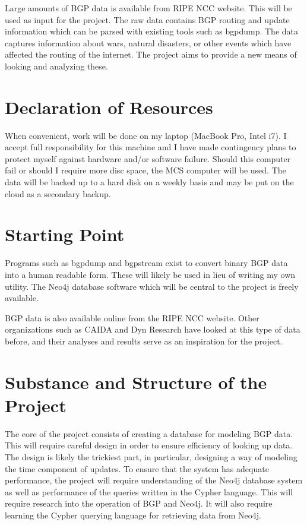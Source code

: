 Large amounts of BGP data is available from RIPE NCC website. This will be used as input for the project. The raw data contains BGP routing and update information which can be parsed with existing tools such as bgpdump. The data captures information about wars, natural disasters, or other events which have affected the routing of the internet. The project aims to provide a new means of looking and analyzing these. 

\section*{Declaration of Resources}

When convenient, work will be done on my laptop (MacBook Pro, Intel i7). I accept full responsibility for this machine and I have made contingency plans to protect myself against hardware and/or software failure. Should this computer fail or should I require more disc space, the MCS computer will be used. The data will be backed up to a hard disk on a weekly basis and may be put on the cloud as a secondary backup. 

\section*{Starting Point}

Programs such as bgpdump and bgpstream exist to convert binary BGP data into a human readable form. These will likely be used in lieu of writing my own utility.  The Neo4j database software which will be central to the project is freely available.

BGP data is also available online from the RIPE NCC website. Other organizations such as CAIDA and Dyn Research have looked at this type of data before, and their analyses and results serve as an inspiration for the project.

\section*{Substance and Structure of the Project}

The core of the project consists of creating a database for modeling BGP data. This will require careful design in order to ensure efficiency of looking up data. The design is likely the trickiest part, in particular, designing a way of modeling the time component of updates. To ensure that the system has adequate performance, the project will require understanding of the Neo4j database system as well as performance of the queries written in the Cypher language. This will require research into the operation of BGP and Neo4j. It will also require learning the Cypher querying language for retrieving data from Neo4j. 

